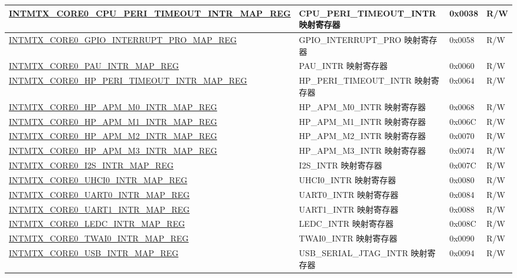 \begin{longtable}{ | p{10cm} | m{10cm} | m{1.3cm} | m{1.0cm} | }
\hyperref[regdesc:INTMTXCORE0CPUPERITIMEOUTINTRMAPREG]{INTMTX\_CORE0\_CPU\_PERI\_TIMEOUT\_INTR\_MAP\_REG} & CPU\_PERI\_TIMEOUT\_INTR 映射寄存器 & 0x0038 & R/W \\ \hline
\hyperref[regdesc:INTMTXCORE0GPIOINTERRUPTPROMAPREG]{INTMTX\_CORE0\_GPIO\_INTERRUPT\_PRO\_MAP\_REG} & GPIO\_INTERRUPT\_PRO 映射寄存器 & 0x0058 & R/W \\ \hline
\hyperref[regdesc:INTMTXCORE0PAUINTRMAPREG]{INTMTX\_CORE0\_PAU\_INTR\_MAP\_REG} & PAU\_INTR 映射寄存器 & 0x0060 & R/W \\ \hline
\hyperref[regdesc:INTMTXCORE0HPPERITIMEOUTINTRMAPREG]{INTMTX\_CORE0\_HP\_PERI\_TIMEOUT\_INTR\_MAP\_REG} & HP\_PERI\_TIMEOUT\_INTR 映射寄存器 & 0x0064 & R/W \\ \hline
\hyperref[regdesc:INTMTXCORE0HPAPMM0INTRMAPREG]{INTMTX\_CORE0\_HP\_APM\_M0\_INTR\_MAP\_REG} & HP\_APM\_M0\_INTR 映射寄存器 & 0x0068 & R/W \\ \hline
\hyperref[regdesc:INTMTXCORE0HPAPMM1INTRMAPREG]{INTMTX\_CORE0\_HP\_APM\_M1\_INTR\_MAP\_REG} & HP\_APM\_M1\_INTR 映射寄存器 & 0x006C & R/W \\ \hline
\hyperref[regdesc:INTMTXCORE0HPAPMM2INTRMAPREG]{INTMTX\_CORE0\_HP\_APM\_M2\_INTR\_MAP\_REG} & HP\_APM\_M2\_INTR 映射寄存器 & 0x0070 & R/W \\ \hline
\hyperref[regdesc:INTMTXCORE0HPAPMM3INTRMAPREG]{INTMTX\_CORE0\_HP\_APM\_M3\_INTR\_MAP\_REG} & HP\_APM\_M3\_INTR 映射寄存器 & 0x0074 & R/W \\ \hline
\hyperref[regdesc:INTMTXCORE0I2SINTRMAPREG]{INTMTX\_CORE0\_I2S\_INTR\_MAP\_REG} & I2S\_INTR 映射寄存器 & 0x007C & R/W \\ \hline
\hyperref[regdesc:INTMTXCORE0UHCI0INTRMAPREG]{INTMTX\_CORE0\_UHCI0\_INTR\_MAP\_REG} & UHCI0\_INTR 映射寄存器 & 0x0080 & R/W \\ \hline
\hyperref[regdesc:INTMTXCORE0UART0INTRMAPREG]{INTMTX\_CORE0\_UART0\_INTR\_MAP\_REG} & UART0\_INTR 映射寄存器 & 0x0084 & R/W \\ \hline
\hyperref[regdesc:INTMTXCORE0UART1INTRMAPREG]{INTMTX\_CORE0\_UART1\_INTR\_MAP\_REG} & UART1\_INTR 映射寄存器 & 0x0088 & R/W \\ \hline
\hyperref[regdesc:INTMTXCORE0LEDCINTRMAPREG]{INTMTX\_CORE0\_LEDC\_INTR\_MAP\_REG} & LEDC\_INTR 映射寄存器 & 0x008C & R/W \\ \hline
\hyperref[regdesc:INTMTXCORE0TWAI0INTRMAPREG]{INTMTX\_CORE0\_TWAI0\_INTR\_MAP\_REG} & TWAI0\_INTR 映射寄存器 & 0x0090 & R/W \\ \hline
\hyperref[regdesc:INTMTXCORE0USBINTRMAPREG]{INTMTX\_CORE0\_USB\_INTR\_MAP\_REG} & USB\_SERIAL\_JTAG\_INTR 映射寄存器 & 0x0094 & R/W \\ \hline

\end{longtable}

